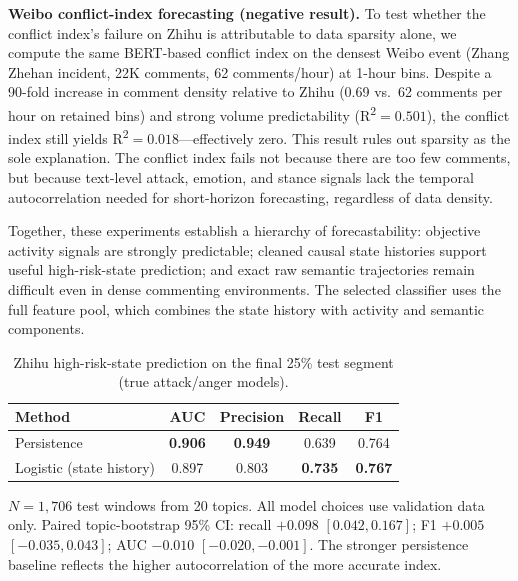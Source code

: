 \documentclass[journal]{IEEEtran}
\begin{document}
\textbf{Weibo conflict-index forecasting (negative result).} To test whether the conflict index's failure on Zhihu is attributable to data sparsity alone, we compute the same BERT-based conflict index on the densest Weibo event (Zhang Zhehan incident, 22K comments, 62 comments/hour) at 1-hour bins. Despite a 90-fold increase in comment density relative to Zhihu (0.69 vs.\ 62 comments per hour on retained bins) and strong volume predictability (R\textsuperscript{2}$=0.501$), the conflict index still yields R\textsuperscript{2}$=0.018$---effectively zero. This result rules out sparsity as the sole explanation. The conflict index fails not because there are too few comments, but because text-level attack, emotion, and stance signals lack the temporal autocorrelation needed for short-horizon forecasting, regardless of data density.

Together, these experiments establish a hierarchy of forecastability: objective activity signals are strongly predictable; cleaned causal state histories support useful high-risk-state prediction; and exact raw semantic trajectories remain difficult even in dense commenting environments. The selected classifier uses the full feature pool, which combines the state history with activity and semantic components.

\begin{table}[H]
\caption{Zhihu high-risk-state prediction on the final 25\% test segment (true attack/anger models).}\label{tab:real_results}
\centering
\begin{threeparttable}

\begin{tabular}{lcccc}
\toprule
\textbf{Method} & \textbf{AUC} & \textbf{Precision} & \textbf{Recall} & \textbf{F1} \\
\midrule
Persistence & \textbf{0.906} & \textbf{0.949} & 0.639 & 0.764 \\
Logistic (state history) & 0.897 & 0.803 & \textbf{0.735} & \textbf{0.767} \\
\bottomrule
\end{tabular}
\begin{tablenotes}
\item $N=1{,}706$ test windows from 20 topics. All model choices use validation data only. Paired topic-bootstrap 95\% CI: recall $+0.098$ $[0.042,0.167]$; F1 $+0.005$ $[-0.035,0.043]$; AUC $-0.010$ $[-0.020,-0.001]$. The stronger persistence baseline reflects the higher autocorrelation of the more accurate index.
\end{tablenotes}
\end{threeparttable}
\end{table}
\end{document}
